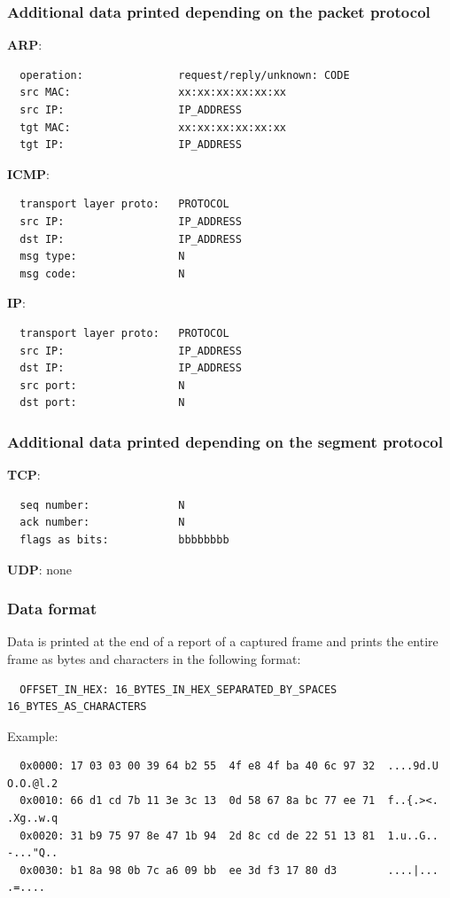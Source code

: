 \documentclass[a4paper]{article}
\begin{document}
  \subsubsection{Additional data printed depending on the packet protocol}

  \noindent
  \textbf{ARP}:
  \begin{verbatim}
  operation:               request/reply/unknown: CODE
  src MAC:                 xx:xx:xx:xx:xx:xx
  src IP:                  IP_ADDRESS
  tgt MAC:                 xx:xx:xx:xx:xx:xx
  tgt IP:                  IP_ADDRESS
  \end{verbatim}

  \noindent
  \textbf{ICMP}:
  \begin{verbatim}
  transport layer proto:   PROTOCOL
  src IP:                  IP_ADDRESS
  dst IP:                  IP_ADDRESS
  msg type:                N
  msg code:                N
  \end{verbatim}

  \noindent
  \textbf{IP}:
  \begin{verbatim}
  transport layer proto:   PROTOCOL
  src IP:                  IP_ADDRESS
  dst IP:                  IP_ADDRESS
  src port:                N
  dst port:                N
  \end{verbatim}


  \subsubsection{Additional data printed depending on the segment protocol}

  \noindent
  \textbf{TCP}:
  \begin{verbatim}
  seq number:              N
  ack number:              N
  flags as bits:           bbbbbbbb
  \end{verbatim}

  \noindent
  \textbf{UDP}:
  none


  \subsubsection{Data format}
  \label{section:data_format}


  Data is printed at the end of a report of a captured frame and prints the 
  entire frame as bytes and characters in the following format:
  \begin{verbatim}
  OFFSET_IN_HEX: 16_BYTES_IN_HEX_SEPARATED_BY_SPACES 16_BYTES_AS_CHARACTERS
  \end{verbatim}
  Example:
  \begin{verbatim}
  0x0000: 17 03 03 00 39 64 b2 55  4f e8 4f ba 40 6c 97 32  ....9d.U O.O.@l.2
  0x0010: 66 d1 cd 7b 11 3e 3c 13  0d 58 67 8a bc 77 ee 71  f..{.><. .Xg..w.q
  0x0020: 31 b9 75 97 8e 47 1b 94  2d 8c cd de 22 51 13 81  1.u..G.. -..."Q..
  0x0030: b1 8a 98 0b 7c a6 09 bb  ee 3d f3 17 80 d3        ....|... .=....
  \end{verbatim}
\end{document}
